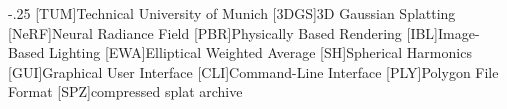 \documentclass[headsepline,footsepline,footinclude=false,oneside,fontsize=11pt,paper=a4,listof=totoc,bibliography=totoc]{scrbook} %
\begin{document}


\frontmatter{}



% 


\tableofcontents{}

\mainmatter{}








\appendix{}


\begin{acronym}
	\itemsep-.25\baselineskip
	[TUM]{Technical University of Munich}
	[3DGS]{3D Gaussian Splatting}
	[NeRF]{Neural Radiance Field}
	[PBR]{Physically Based Rendering}
	[IBL]{Image-Based Lighting}
	[EWA]{Elliptical Weighted Average}
	[SH]{Spherical Harmonics}
	[GUI]{Graphical User Interface}
	[CLI]{Command-Line Interface}
	[PLY]{Polygon File Format}
	[SPZ]{compressed splat archive}
\end{acronym}

\listoffigures{}
\listoftables{}
\printbibliography{}
\end{document}
